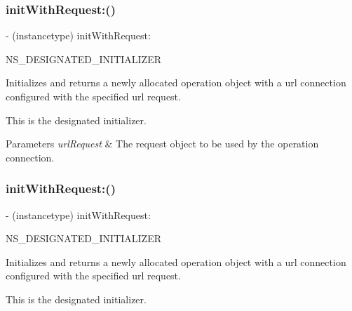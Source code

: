 \subsubsection{\texorpdfstring{init\+With\+Request\+:()}{initWithRequest:()}\hspace{0.1cm}{\footnotesize\ttfamily [2/3]}}
{\footnotesize\ttfamily -\/ (instancetype) init\+With\+Request\+: \begin{DoxyParamCaption}\item[{(N\+S\+U\+R\+L\+Request $\ast$)}]{N\+S\+\_\+\+D\+E\+S\+I\+G\+N\+A\+T\+E\+D\+\_\+\+I\+N\+I\+T\+I\+A\+L\+I\+Z\+ER }\end{DoxyParamCaption}}

Initializes and returns a newly allocated operation object with a url connection configured with the specified url request.

This is the designated initializer.


\begin{DoxyParams}{Parameters}
{\em url\+Request} & The request object to be used by the operation connection. \\
\hline
\end{DoxyParams}
\mbox{\label{interface_a_f_u_r_l_connection_operation_aa9923ab9910d684883ff1098b0db9e35}} 
\subsubsection{\texorpdfstring{init\+With\+Request\+:()}{initWithRequest:()}\hspace{0.1cm}{\footnotesize\ttfamily [3/3]}}
{\footnotesize\ttfamily -\/ (instancetype) init\+With\+Request\+: \begin{DoxyParamCaption}\item[{(N\+S\+U\+R\+L\+Request $\ast$)}]{N\+S\+\_\+\+D\+E\+S\+I\+G\+N\+A\+T\+E\+D\+\_\+\+I\+N\+I\+T\+I\+A\+L\+I\+Z\+ER }\end{DoxyParamCaption}}

Initializes and returns a newly allocated operation object with a url connection configured with the specified url request.

This is the designated initializer.


